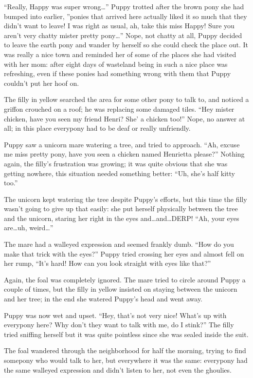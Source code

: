 ``Really, Happy was super wrong\dots'' Puppy trotted after the brown pony she had bumped into earlier, ''ponies that arrived here actually liked it so much that they didn't want to leave! I was right as usual, ah, take this miss Happy! Sure you aren't very chatty mister pretty pony\dots'' Nope, not chatty at all, Puppy decided to leave the earth pony and wander by herself so she could check the place out. It was really a nice town and reminded her of some of rhe places she had visited with her mom: after eight days of wasteland being in such a nice place was refreshing, even if these ponies had something wrong with them that Puppy couldn't put her hoof on.

The filly in yellow searched the area for some other pony to talk to, and noticed a griffon crouched on a roof; he was replacing some damaged tiles. ``Hey mister chicken, have you seen my friend Henri? She' a chicken too!'' Nope, no answer at all; in this place everypony had to be deaf or really unfriendly.

Puppy saw a unicorn mare watering a tree, and tried to approach. ``Ah, excuse me miss pretty pony, have you seen a chicken named Henrietta please?'' Nothing again, the filly's frustration was growing; it was quite obvious that she was getting nowhere, this situation needed something better: ``Uh, she's half kitty too.''

The unicorn kept watering the tree despite Puppy's efforts, but this time the filly wasn't going to give up that easily: she put herself physically between the tree and the unicorn, staring her right in the eyes and\dots and\dots DERP! ``Ah, your eyes are\dots uh, weird\dots''

The mare had a walleyed expression and seemed frankly dumb. ``How do you make that trick with the eyes?'' Puppy tried crossing her eyes and almost fell on her rump, ``It's hard! How can you look straight with eyes like that?''

Again, the foal was completely ignored. The mare tried to circle around Puppy a couple of times, but the filly in yellow insisted on staying between the unicorn and her tree; in the end she watered Puppy's head and went away.

Puppy was now wet and upset. ``Hey, that's not very nice! What's up with everypony here? Why don't they want to talk with me, do I stink?'' The filly tried sniffing herself but it was quite pointless since she was sealed inside the suit.

The foal wandered through the neighborhood for half the morning, trying to find somepony who would talk to her, but everywhere it was the same: everypony had the same walleyed expression and didn't listen to her, not even the ghoulies.

